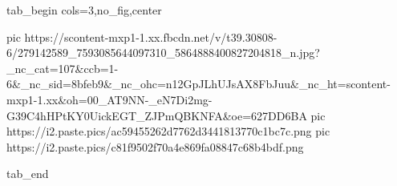  
 
 
 
 

\ifcmt
  tab_begin cols=3,no_fig,center

     pic https://scontent-mxp1-1.xx.fbcdn.net/v/t39.30808-6/279142589_7593085644097310_5864888400827204818_n.jpg?_nc_cat=107&ccb=1-6&_nc_sid=8bfeb9&_nc_ohc=n12GpJLhUJsAX8FbJuu&_nc_ht=scontent-mxp1-1.xx&oh=00_AT9NN-_eN7Di2mg-G39C4hHPtKY0UickEGT_ZJPmQBKNFA&oe=627DD6BA
		 pic https://i2.paste.pics/ac59455262d7762d3441813770c1bc7c.png
		 pic https://i2.paste.pics/c81f9502f70a4e869fa08847c68b4bdf.png

  tab_end
\fi
